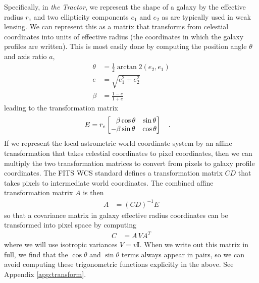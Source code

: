 \documentclass[11pt,preprint]{aastex}
\newcommand{\appref}[1]{Appendix \ref{#1}}
\newcommand{\project}[1]{\textsl{#1}}
\newcommand{\transpose}[1]{#1^{T}}
\newcommand{\CD}{C\!D}
\begin{document}
Specifically, in \project{the Tractor}, we represent the shape of a
galaxy by the effective radius $r_e$ and two ellipticity components
$e_1$ and $e_2$ as are typically used in weak lensing.  We can
represent this as a matrix that transforms from celestial coordinates
into units of effective radius (the coordinates in which the galaxy
profiles are written).  This is most easily done by computing the
position angle $\theta$ and axis ratio $a$,
\begin{align}
%
\theta & = \frac{1}{2} \arctan\!2(e_2, e_1) \\
%
e & = \sqrt{e_1^2 + e_2^2} \\
%
\beta & = \frac{1 - e}{1 + e} \label{eq:a}
\end{align}
leading to the transformation matrix
\begin{align}
E &= r_e \begin{bmatrix}
\textcolor{white}{-}\beta \cos{\theta} & \sin{\theta} \\
-\beta \sin{\theta} & \cos{\theta} \\
\end{bmatrix} \quad .
\end{align}
If we represent the local astrometric world coordinate system by an
affine transformation that takes celestial coordinates to pixel
coordinates, then we can multiply the two transformation matrices to
convert from pixels to galaxy profile coordinates.  The FITS WCS
standard \citep{wcs2} defines a transformation matrix $\CD$ that takes
pixels to intermediate world coordinates.  The combined affine transformation
matrix $A$ is then
\begin{align}
A & = (\CD)^{-1} E
\end{align}
so that a covariance matrix in galaxy effective radius coordinates can
be transformed into pixel space by computing
\begin{align}
C &= A \, V \transpose{A}
\label{eq:vpix}
\end{align}
where we will use isotropic variances $V = v \bm{I}$.
When we write out this matrix in full, we find that the $\cos{\theta}$
and $\sin{\theta}$ terms always appear in pairs, so we can avoid
computing these trigonometric functions explicitly in the above.  See
\appref{app:transform}.
\end{document}
